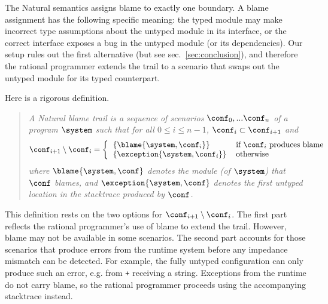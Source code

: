 
The Natural semantics assigns blame to exactly one boundary.  A blame assignment
has the following specific meaning: the typed module may make incorrect type
assumptions about the untyped module in its interface, or the correct
interface exposes a bug in the untyped module (or its dependencies). Our setup rules out the first
alternative (but see sec.~\ref{sec:conclusion}), and therefore the rational
programmer extends the trail to a scenario that swaps out the untyped
module for its typed counterpart.



Here is a rigorous definition. 
\begin{quote}
\it A \emph{Natural blame trail} is a sequence of scenarios $\conf_0,...\conf_n$ of
a program $\system$ such that for all $0 \leq i \leq n - 1$, $\conf_i \subset
\conf_{i+1}$ and
\[ \conf_{i+1} \setminus \conf_i = %
\left\{ %
\begin{tabular}{ll} %
$\{\blame{\system, \conf_i}\}$      & if $\conf_i$ produces blame \\ %
$\{\exception{\system, \conf_i}\}$  & otherwise \\ %
\end{tabular} \right. %
\]
where $\blame{\system, \conf}$ denotes the module (of $\system$) that $\conf$ blames,
and $\exception{\system, \conf}$ denotes the first untyped location in the stacktrace produced by $\conf$.
\end{quote}

This definition rests on the two options for $\conf_{i+1} \setminus \conf_i$.
The first part reflects the rational programmer's use of blame to extend the
trail. However, blame may not be available in some scenarios. The second part
accounts for those scenarios that produce errors from the runtime system before
any impedance mismatch can be detected. For example, the fully untyped
configuration can only produce such an error, e.g. from {\tt +} receiving a
string. Exceptions from the runtime do not carry blame, so
the rational programmer proceeds using the accompanying stacktrace instead.

